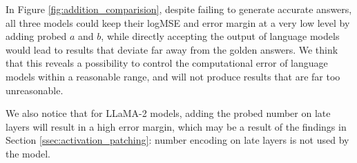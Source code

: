 \documentclass[11pt]{article}
\begin{document}
In Figure \ref{fig:addition_comparision}, despite failing to generate accurate answers, all three models could keep their logMSE and error margin at a very low level by adding probed $a$ and $b$, while directly accepting the output of language models would lead to results that deviate far away from the golden answers.
We think that this reveals a possibility to control the computational error of language models within a reasonable range, and will not produce results that are far too unreasonable.

We also notice that for LLaMA-2 models, adding the probed number on late layers will result in a high error margin, which may be a result of the findings in Section \ref{ssec:activation_patching}: number encoding on late layers is not used by the model.
\end{document}
